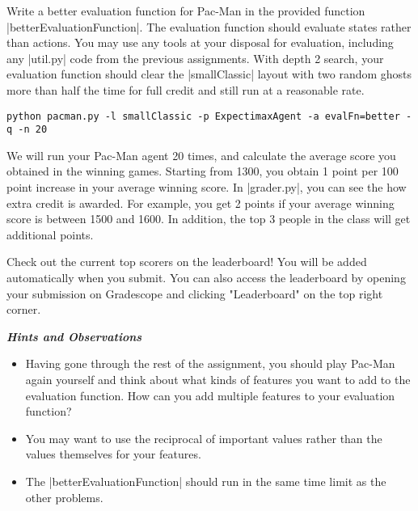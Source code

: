 \item {}
Write a better evaluation function for Pac-Man in the provided function
|betterEvaluationFunction|. The evaluation function should evaluate states
rather than actions. You may use any tools at your disposal for evaluation,
including any |util.py| code from the previous assignments. With depth 2 search,
your evaluation function should clear the |smallClassic| layout with two random
ghosts more than half the time for full credit and still run at a reasonable
rate.

\begin{lstlisting}
python pacman.py -l smallClassic -p ExpectimaxAgent -a evalFn=better -q -n 20
\end{lstlisting}

We will run your Pac-Man agent 20 times, and calculate the average score you
obtained in the winning games. Starting from 1300, you obtain 1 point per 100
point increase in your average winning score. In |grader.py|, you can see the
how extra credit is awarded. For example, you get 2 points if your average
winning score is between 1500 and 1600. In addition, the top 3 people in the
class will get additional points.

Check out the current top scorers on the leaderboard! You will be added
automatically when you submit. You can also access the leaderboard by opening
your submission on Gradescope and clicking "Leaderboard" on the top right
corner.

{\bf {\em Hints and Observations}}
\begin{itemize}
  \item Having gone through the rest of the assignment, you should play Pac-Man
  again yourself and think about what kinds of features you want to add to the
  evaluation function. How can you add multiple features to your evaluation
  function?
  \item You may want to use the reciprocal of important values rather than the
  values themselves for your features.
  \item The |betterEvaluationFunction| should run in the same time limit as the
  other problems.
\end{itemize}